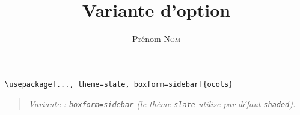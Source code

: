 \documentclass[11pt]{ocots-book}
\title{Variante d'option}
\author{Prénom \textsc{Nom}}
\newcommand{\ocotsvariantnote}[1]{\begin{quote}\itshape Variante : #1\end{quote}}
\begin{document}
\maketitle

\begin{lstlisting}
\usepackage[..., theme=slate, boxform=sidebar]{ocots}
\end{lstlisting}
\ocotsvariantnote{\texttt{boxform=sidebar} (le th\`eme \texttt{slate} utilise par d\'efaut \texttt{shaded}).}

\end{document}
